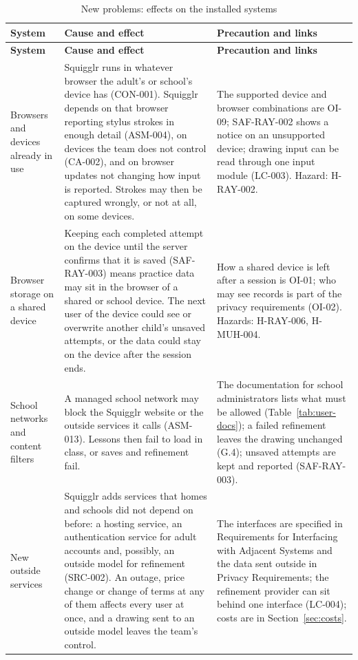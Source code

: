 \documentclass[12pt]{article}
\renewcommand{\_}{\textunderscore\allowbreak}%
\begin{document}
{\small
\begin{longtable}{@{}>{\raggedright\arraybackslash}p{}%
>{\raggedright\arraybackslash}p{}%
>{\raggedright\arraybackslash}p{}@{}}
\caption{New problems: effects on the installed systems}
\label{tab:new-problems-installed}\\
\toprule
\textbf{System} & \textbf{Cause and effect} & \textbf{Precaution and links} \\
\midrule
\endfirsthead
\toprule
\textbf{System} & \textbf{Cause and effect} & \textbf{Precaution and links} \\
\midrule
\endhead
\bottomrule
\endlastfoot
Browsers and devices already in use & Squigglr runs in whatever browser the
adult's or school's device has (CON-001). Squigglr depends on that browser
reporting stylus strokes in enough detail (ASM-004), on devices the team does
not control (CA-002), and on browser updates not changing how input is reported.
Strokes may then be captured wrongly, or not at all, on some devices. & The
supported device and browser combinations are OI-09; SAF-RAY-002 shows a notice
on an unsupported device; drawing input can be read through one input module
(LC-003). Hazard: H-RAY-002. \\
\addlinespace
Browser storage on a shared device & Keeping each completed attempt on the
device until the server confirms that it is saved (SAF-RAY-003) means practice
data may sit in the browser of a shared or school device. The next user of the
device could see or overwrite another child's unsaved attempts, or the data
could stay on the device after the session ends. & How a shared device is left
after a session is OI-01; who may see records is part of the privacy
requirements (OI-02). Hazards: H-RAY-006, H-MUH-004. \\
\addlinespace
School networks and content filters & A managed school network may block the
Squigglr website or the outside services it calls (ASM-013). Lessons then fail
to load in class, or saves and refinement fail. & The documentation for school
administrators lists what must be allowed (Table~\ref{tab:user-docs}); a failed
refinement leaves the drawing unchanged (G.4); unsaved attempts are kept and
reported (SAF-RAY-003). \\
\addlinespace
New outside services & Squigglr adds services that homes and schools did not
depend on before: a hosting service, an authentication service for adult
accounts and, possibly, an outside model for refinement (SRC-002). An outage,
price change or change of terms at any of them affects every user at once, and a
drawing sent to an outside model leaves the team's control. & The interfaces are
specified in Requirements for Interfacing with Adjacent Systems and the data
sent outside in Privacy Requirements; the refinement provider can sit behind one
interface (LC-004); costs are in Section~\ref{sec:costs}. \\
\end{longtable}
}
\end{document}
